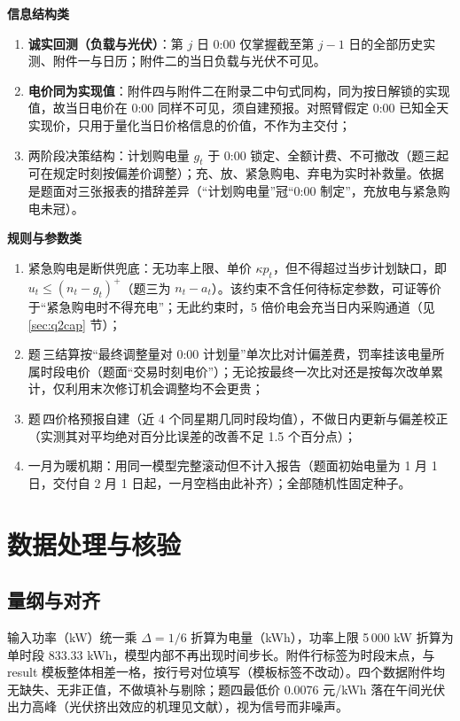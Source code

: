 \documentclass[12pt,a4paper]{ctexart}
\begin{document}
\textbf{信息结构类}
\begin{enumerate}[label=A\arabic*., leftmargin=3em, start=5]
  \item \textbf{诚实回测（负载与光伏）}：第 $j$ 日 0:00 仅掌握截至第 $j-1$ 日的全部历史实测、附件一与日历；附件二的当日负载与光伏不可见。
  \item[A5$'$.] \textbf{电价同为实现值}：附件四与附件二在附录二中句式同构，同为按日解锁的实现值，故当日电价在 0:00 同样不可见，须自建预报。对照臂假定 0:00 已知全天实现价，只用于量化当日价格信息的价值，不作为主交付；
  \item[A6.] 两阶段决策结构：计划购电量 $g_t$ 于 0:00 锁定、全额计费、不可撤改（题三起可在规定时刻按偏差价调整）；充、放、紧急购电、弃电为实时补救量。依据是题面对三张报表的措辞差异（“计划购电量”冠“0:00 制定”，充放电与紧急购电未冠）。
\end{enumerate}

\textbf{规则与参数类}
\begin{enumerate}[label=A\arabic*., leftmargin=3em, start=7]
  \item 紧急购电是断供兜底：无功率上限、单价 $\kappa p_t$，但不得超过当步计划缺口，即 $u_t\le(n_t-g_t)^+$（题三为 $n_t-a_t$）。该约束不含任何待标定参数，可证等价于“紧急购电时不得充电”；无此约束时，5 倍价电会充当日内采购通道（见 \ref{sec:q2cap} 节）；
  \item 题\,三结算按“最终调整量对 0:00 计划量”单次比对计偏差费，罚率挂该电量所属时段电价（题面“交易时刻电价”）；无论按最终一次比对还是按每次改单累计，仅利用末次修订机会调整均不会更贵；
  \item 题\,四价格预报自建（近 4 个同星期几同时段均值），不做日内更新与偏差校正（实测其对平均绝对百分比误差的改善不足 1.5 个百分点）；
  \item 一月为暖机期：用同一模型完整滚动但不计入报告（题面初始电量为 1 月 1 日，交付自 2 月 1 日起，一月空档由此补齐）；全部随机性固定种子。
\end{enumerate}

\section{数据处理与核验}

\subsection{量纲与对齐}

输入功率（kW）统一乘 $\Delta=1/6$ 折算为电量（kWh），功率上限 5\,000 kW 折算为单时段 833.33 kWh，模型内部不再出现时间步长。附件行标签为时段末点，与 result 模板整体相差一格，按行号对位填写（模板标签不改动）。四个数据附件均无缺失、无非正值，不做填补与剔除；题四最低价 0.0076 元/kWh 落在午间光伏出力高峰（光伏挤出效应的机理见文献\cite{denholm2007}），视为信号而非噪声。
\end{document}
